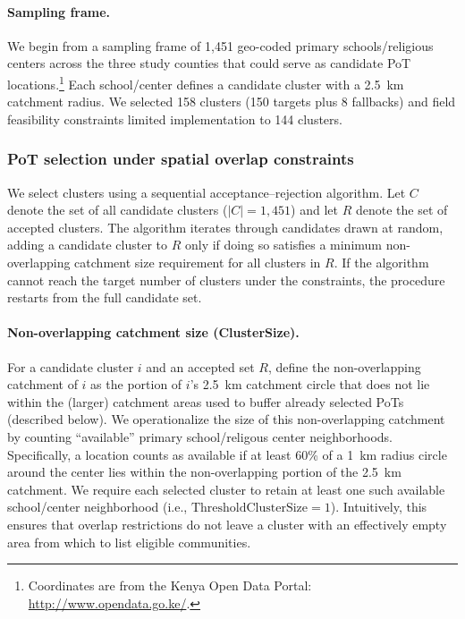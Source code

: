 \paragraph{Sampling frame.}
We begin from a sampling frame of 1{,}451 geo-coded primary schools/religious centers across the three study counties that could serve
as candidate PoT locations.\footnote{Coordinates are from the Kenya Open Data Portal: \url{http://www.opendata.go.ke/}.}
Each school/center defines a candidate cluster with a 2.5~km catchment radius. We selected 158 clusters (150 targets plus
8 fallbacks) and field feasibility constraints limited implementation to 144 clusters.%

\subsubsection*{PoT selection under spatial overlap constraints}

We select clusters using a sequential acceptance--rejection algorithm. Let \(C\) denote the set of all candidate clusters
(\(|C|=1{,}451\)) and let \(R\) denote the set of accepted clusters. The algorithm iterates through candidates drawn
at random, adding a candidate cluster to \(R\) only if doing so satisfies a minimum non-overlapping catchment size
requirement for all clusters in \(R\). If the algorithm cannot reach the target number of clusters under the
constraints, the procedure restarts from the full candidate set.

\paragraph{Non-overlapping catchment size (ClusterSize).}
For a candidate cluster \(i\) and an accepted set \(R\), define the non-overlapping catchment of \(i\) as the
portion of \(i\)'s 2.5~km catchment circle that does not lie within the (larger) catchment areas used to buffer
already selected PoTs (described below). We operationalize the size of this non-overlapping catchment by counting
``available'' primary school/religous center neighborhoods. Specifically, a location counts as available if at least 60\% of a 1~km radius
circle around the center lies within the non-overlapping portion of the 2.5~km catchment. We require each selected cluster to retain at least one such
available school/center neighborhood (i.e., \(\text{ThresholdClusterSize}=1\)). Intuitively, this ensures that overlap
restrictions do not leave a cluster with an effectively empty area from which to list eligible communities.

